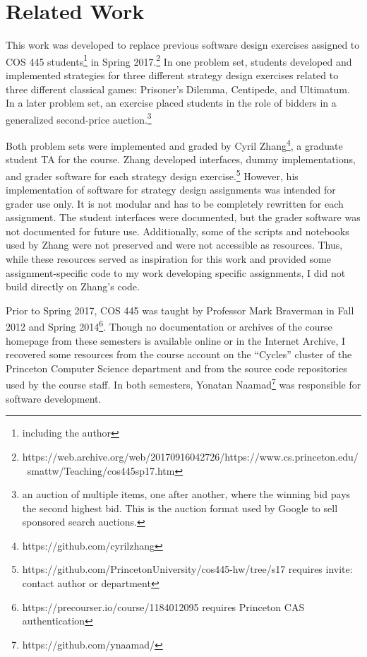 \documentclass[pageno]{jpaper}
\begin{document}

\section*{Related Work}
This work was developed to replace previous software design exercises assigned to COS 445 students\footnote{including the author} in Spring 2017.\footnote{https://web.archive.org/web/20170916042726/https://www.cs.princeton.edu/~smattw/Teaching/cos445sp17.htm}
In one problem set, students developed and implemented strategies for three different strategy design exercises related to three different classical games: Prisoner's Dilemma, Centipede, and Ultimatum.
In a later problem set, an exercise placed students in the role of bidders in a generalized second-price auction.\footnote{an auction of multiple items, one after another, where the winning bid pays the second highest bid. This is the auction format used by Google to sell sponsored search auctions.}

Both problem sets were implemented and graded by Cyril Zhang\footnote{https://github.com/cyrilzhang}, a graduate student TA for the course.
Zhang developed interfaces, dummy implementations, and grader software for each strategy design exercise.\footnote{https://github.com/PrincetonUniversity/cos445-hw/tree/s17 requires invite: contact author or department}
However, his implementation of software for strategy design assignments was intended for grader use only.
It is not modular and has to be completely rewritten for each assignment.
The student interfaces were documented, but the grader software was not documented for future use.
Additionally, some of the scripts and notebooks used by Zhang were not preserved and were not accessible as resources.
Thus, while these resources served as inspiration for this work and provided some assignment-specific code to my work developing specific assignments, I did not build directly on Zhang's code.

Prior to Spring 2017, COS 445 was taught by Professor Mark Braverman in Fall 2012 and Spring 2014\footnote{https://precourser.io/course/1184012095 requires Princeton CAS authentication}.
Though no documentation or archives of the course homepage from these semesters is available online or in the Internet Archive, I recovered some resources from the course account on the ``Cycles'' cluster of the Princeton Computer Science department and from the source code repositories used by the course staff.
In both semesters, Yonatan Naamad\footnote{https://github.com/ynaamad/} was responsible for software development.
\end{document}
